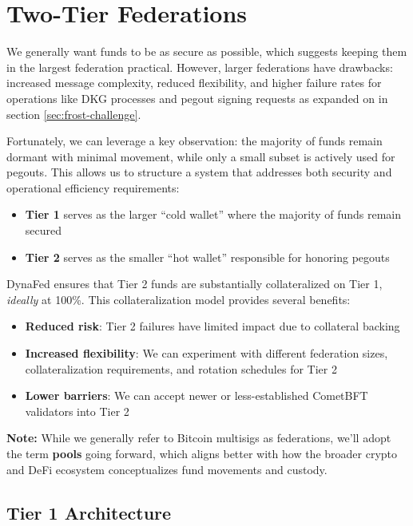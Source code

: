 \section{Two-Tier Federations}
\label{sec:two-tier-federations}

We generally want funds to be as secure as possible, which suggests keeping them in the largest federation practical. However, larger federations have drawbacks: increased message complexity, reduced flexibility, and higher failure rates for operations like DKG processes and pegout signing requests as expanded on in section \ref{sec:frost-challenge}.

Fortunately, we can leverage a key observation: the majority of funds remain dormant with minimal movement, while only a small subset is actively used for pegouts. This allows us to structure a system that addresses both security and operational efficiency requirements:

\begin{itemize}
    \item \textbf{Tier 1} serves as the larger ``cold wallet'' where the majority of funds remain secured
    \item \textbf{Tier 2} serves as the smaller ``hot wallet'' responsible for honoring pegouts
\end{itemize}

DynaFed ensures that Tier 2 funds are substantially collateralized on Tier 1, \emph{ideally} at 100\%. This collateralization model provides several benefits:

\begin{itemize}
    \item \textbf{Reduced risk}: Tier 2 failures have limited impact due to collateral backing
    \item \textbf{Increased flexibility}: We can experiment with different federation sizes, collateralization requirements, and rotation schedules for Tier 2
    \item \textbf{Lower barriers}: We can accept newer or less-established CometBFT validators into Tier 2
\end{itemize}

\textbf{Note:} While we generally refer to Bitcoin multisigs as federations, we'll adopt the term \textbf{pools} going forward, which aligns better with how the broader crypto and DeFi ecosystem conceptualizes fund movements and custody.

\subsection{Tier 1 Architecture}

